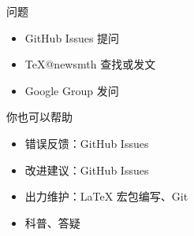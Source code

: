 \begin{frame}{\ThuThesis 问题}
	\begin{itemize}
		\item GitHub Issues 提问
		\item \TeX @newsmth 查找或发文
		\item \href{http://groups.google.com/group/thuthesis}\ThuThesis{} Google Group 发问
	\end{itemize}
\end{frame}


\begin{frame}{你也可以帮助}
	\begin{itemize}
		\item 错误反馈：GitHub Issues
		\item 改进建议：GitHub Issues
		\item 出力维护：LaTeX 宏包编写、Git
		\item 科普、答疑%
	\end{itemize}
\end{frame}

